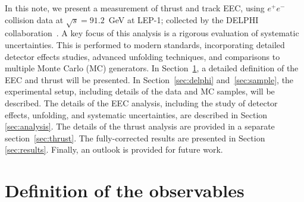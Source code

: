 \documentclass[a4paper,11pt]{article}
\begin{document}
In this note, we present a measurement of thrust and track EEC, using $e^{+}e^{-}$ collision data at $\sqrt{s} = 91.2$~GeV at LEP-1; collected by the DELPHI collaboration~\cite{DELPHI:1990cdc}.
A key focus of this analysis is a rigorous evaluation of systematic uncertainties. This is performed to modern standards, incorporating detailed detector effects studies, advanced unfolding techniques, and comparisons to multiple Monte Carlo (MC) generators.
In Section~\ref{sec:def}, a detailed definition of the EEC and thrust will be presented. 
In Section~\ref{sec:delphi} and~\ref{sec:sample}, the experimental setup, including details of the data and MC samples, will be described.
The details of the EEC analysis, including the study of detector effects, unfolding, and systematic uncertainties, are described in Section \ref{sec:analysis}. 
The details of the thrust analysis are provided in a separate section~\ref{sec:thrust}. 
The fully-corrected results are presented in Section \ref{sec:results}. 
Finally, an outlook is provided for future work.  

\section{Definition of the observables}\label{sec:def}
\end{document}
